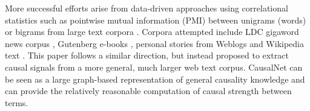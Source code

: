 More successful efforts arise from data-driven approaches
using correlational statistics \cite{gordon2012copa} such as pointwise mutual
information (PMI) between unigrams (words) or bigrams from large
text corpora \cite{Mihalcea2006:CKM}. Corpora attempted include LDC
gigaword news corpus \cite{goodwin2012utdhlt}, Gutenberg e-books
\cite{roemmele2011choice}, personal stories from Weblogs
\cite{gordon2011commonsense} and Wikipedia text
\cite{jabeen2014exploiting}.
This paper follows a similar direction, but instead proposed to extract
causal signals from a more general, much larger web text corpus.
CausalNet can be seen as a large graph-based representation of general
causality knowledge and can provide the relatively reasonable computation of
causal strength between terms.
